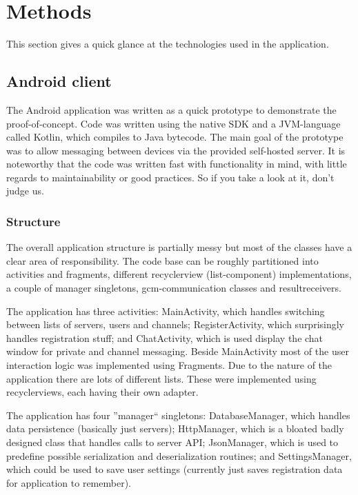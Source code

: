 \section{Methods}
This section gives a quick glance at the technologies used in the application.

\subsection{Android client}
The Android application was written as a quick prototype to demonstrate the proof-of-concept. Code was written using the native SDK and a JVM-language called Kotlin, which compiles to Java bytecode. The main goal of the prototype was to allow messaging between devices via the provided self-hosted server. It is noteworthy that the code was written fast with functionality in mind, with little regards to maintainability or good practices. So if you take a look at it, don't judge us.

\subsubsection{Structure}

The overall application structure is partially messy but most of the classes have a clear area of responsibility. The code base can be roughly partitioned into activities and fragments, different recyclerview (list-component) implementations, a couple of manager singletons, gcm-communication classes and resultreceivers.

The application has three activities: MainActivity, which handles switching between lists of servers, users and channels; RegisterActivity, which surprisingly handles registration stuff; and ChatActivity, which is used display the chat window for private and channel messaging. Beside MainActivity most of the user interaction logic was implemented using Fragments. Due to the nature of the application there are lots of different lists. These were implemented using recyclerviews, each having their own adapter.

The application has four ''manager`` singletons: DatabaseManager, which handles data persistence (basically just servers); HttpManager, which is a bloated badly designed class that handles calls to server API; JsonManager, which is used to predefine possible serialization and deserialization routines; and SettingsManager, which could be used to save user settings (currently just saves registration data for application to remember). 

